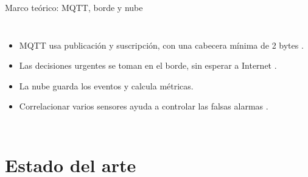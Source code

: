 \documentclass[aspectratio=169,10pt]{beamer}
\begin{document}
\begin{frame}{Marco teórico: MQTT, borde y nube}
  \begin{columns}[c]
    \centering
    \begin{itemize}
      \item MQTT usa publicación y suscripción, con una cabecera mínima de 2 bytes \cite{alfuqaha2015survey, light2017mosquitto}.
      \item Las decisiones urgentes se toman en el borde, sin esperar a Internet \cite{shi2016edge}.
      \item La nube guarda los eventos y calcula métricas.
      \item Correlacionar varios sensores ayuda a controlar las falsas alarmas \cite{walchli2009building, pugh2015fusion}.
    \end{itemize}
  \end{columns}
\end{frame}

\section{Estado del arte}
\end{document}
